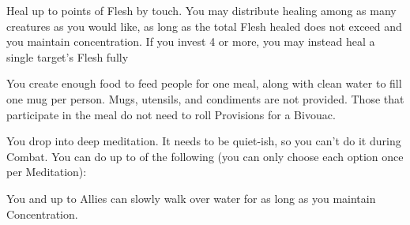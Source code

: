    \SACRAMENT [
      Name=Heal,
      Link=mystic-sacrament-lay-on-hands,
      Paradigm=Grace,
      Save=N,
      Duration=Concentration,
      Counter=None,
      Keywords=None,
      Target=Close (touch) Allies
    ]

    Heal up to \SUMDICE points of Flesh by touch. You may distribute healing among as many creatures as you would like, as long as the total Flesh healed does not exceed \SUMDICE and you maintain concentration. If you invest 4 \DICE or more, you may instead heal a single target's Flesh fully






   \SACRAMENT [
      Name=Loaves and Fishes,
      Link=mystic-sacrament-loaves-and-fishes,
      Paradigm=Grace,
      Save=N,
      Duration=0,
      Counter=None,
      Keywords=None,
      Target=Close radius
    ]


    You create enough food to feed \SUMDICE people for one meal, along with clean water to fill one mug per person. Mugs, utensils, and condiments are not provided.  Those that participate in the meal do not need to roll Provisions for a Bivouac.  

    \SACRAMENT [
      Name=Meditation,
      Link=mystic-sacrament-meditation,
      Paradigm=Grace,
      Save=N,
      Duration=0,
      Counter=None,
      Keywords=0,
      Target=Self
    ]

    You drop into deep meditation.  It needs to be quiet-ish, so you can't do it during Combat.  You can do up to \DICE of the following (you can only choose each option once per Meditation):


    \cbreak


    \SACRAMENT [
      Name=Walk on Water,
      Link=mystic-sacrament-walk-water,
      Paradigm=Grace,
      Save=N,
      Duration=Concentration,
      Counter=None,
      Keywords=Splittable,
      Target=Self and \DICE-1 Close (touch) Allies
    ]

    You and up to  Allies can slowly walk over water for as long as you maintain Concentration. 

